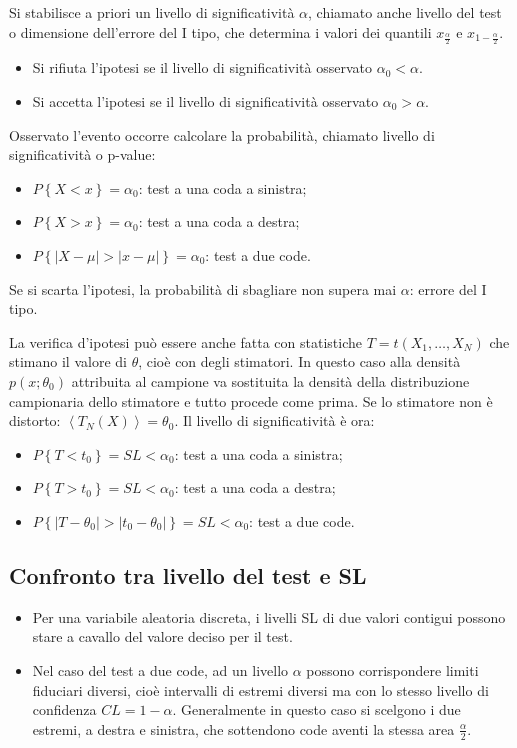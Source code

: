Si stabilisce a priori un livello di significatività $\alpha$, chiamato anche livello del test o dimensione dell'errore del I tipo, che determina i valori dei quantili ${ x }_{ \frac { \alpha  }{ 2 } }$ e ${ x }_{ 1-\frac { \alpha  }{ 2 } }$.
\begin{itemize}
\item Si rifiuta l'ipotesi se il livello di significatività osservato $\alpha_0<\alpha$.
\item Si accetta l'ipotesi se il livello di significatività osservato $\alpha_0>\alpha$.
\end{itemize}
Osservato l'evento occorre calcolare la probabilità, chiamato livello di significatività o p-value:
\begin{itemize}
\item $P\left\{ X<x \right\} ={ \alpha  }_{ 0 }$: test a una coda a sinistra;
\item $P\left\{ X>x \right\} ={ \alpha  }_{ 0 }$: test a una coda a destra;
\item $P\left\{ \left| X-\mu  \right| >\left| x-\mu  \right|  \right\} ={ \alpha  }_{ 0 }$: test a due code.
\end{itemize}
Se si scarta l'ipotesi, la probabilità di sbagliare non supera mai $\alpha$: errore del I tipo.

La verifica d'ipotesi può essere anche fatta con statistiche $T=t\left( { X }_{ 1 },\dots ,{ X }_{ N }  \right) $ che stimano il valore di $\theta$, cioè con degli stimatori. In questo caso alla densità $p\left( x;\theta_0  \right) $ attribuita al campione va sostituita la densità della distribuzione campionaria dello stimatore e tutto procede come prima. Se lo stimatore non è distorto: $\left< T_{ N }\left( X \right)  \right> =\theta _{ 0 }$.
Il livello di significatività è ora:
\begin{itemize}
\item $P\left\{ T<t_0 \right\} =SL< { \alpha  }_{ 0 }$: test a una coda a sinistra;
\item $P\left\{ T>t_0 \right\} =SL< { \alpha  }_{ 0 }$: test a una coda a destra;
\item $P\left\{ \left| T-\theta_0  \right| >\left| t_0-\theta_0  \right|  \right\} =SL<{ \alpha  }_{ 0 }$: test a due code.
\end{itemize}

\subsection{Confronto tra livello del test e SL}
\begin{itemize}
\item Per una variabile aleatoria discreta, i livelli SL di due valori contigui possono stare a cavallo del valore deciso per il test.
\item Nel caso del test a due code, ad un livello $\alpha$ possono corrispondere limiti fiduciari diversi, cioè intervalli di estremi diversi ma con lo stesso livello di confidenza $CL=1-\alpha$. Generalmente in questo caso si scelgono i due estremi, a destra e sinistra, che sottendono code aventi la stessa area $\frac{\alpha}{2}$.
\end{itemize}

